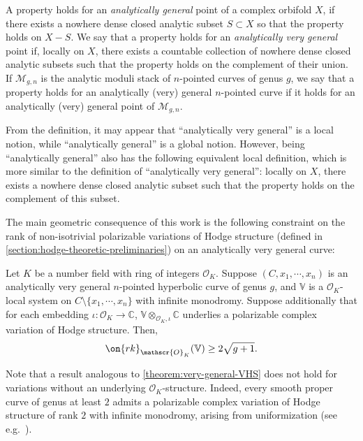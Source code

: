 \begin{definition}
\notready
	\label{definition:general}
	A property holds for an {\em analytically general} point of a complex orbifold $X$,
	if there exists a nowhere dense
	closed analytic subset $S \subset X$ so that the property holds
	on $X - S$.
	We say that a property holds for an
	{\em analytically very general} point if, locally on $X$, there exists a countable collection of nowhere dense closed analytic subsets such that the property holds on the complement of their union. If $\mathscr{M}_{g,n}$ is the analytic moduli stack of
$n$-pointed curves of genus $g$, we say that a property holds for an
analytically (very) general $n$-pointed curve if it holds for an analytically
(very) general point of $\mathscr{M}_{g,n}$.
\end{definition}
\begin{remark}
\notready\label{remark:}
	From the definition, it may appear that ``analytically very general'' is
	a local notion, while ``analytically general'' is a global notion.
	However, being ``analytically general'' also has the following
	equivalent local definition, which is more similar to the definition of
	``analytically very general'':
	locally on $X$, there exists a nowhere dense closed analytic subset such
	that the property holds on the complement of this subset.
\end{remark}

The main geometric consequence of this work is the following constraint on the
rank of non-isotrivial polarizable variations of Hodge structure (defined in
\autoref{section:hodge-theoretic-preliminaries}) on an analytically very general curve:
\begin{theorem}
\notready\label{theorem:very-general-VHS}
	Let $K$ be a number field with ring of integers
$\mathscr{O}_K$. Suppose
$(C, x_1, \cdots, x_n)$
is an analytically very general $n$-pointed
hyperbolic curve of genus $g$, and $\mathbb{V}$ is a $\mathscr{O}_K$-local system on $C\setminus\{x_1, \cdots, x_n\}$ with infinite monodromy.
Suppose additionally that for each embedding $\iota: \mathscr{O}_K\to \mathbb{C}$, $\mathbb{V}\otimes_{\mathscr{O}_K, \iota}\mathbb{C}$ underlies a polarizable complex variation of Hodge structure.
Then, $$\on{rk}_{\mathscr{O}_K}(\mathbb{V})\geq 2\sqrt{g+1}.$$
\end{theorem}
\begin{remark}
\notready
	\label{remark:}
	Note that a result analogous to \autoref{theorem:very-general-VHS} does
	not hold for variations without an underlying $\mathscr{O}_K$-structure.
	Indeed, every smooth proper curve of genus at least $2$ admits a polarizable complex  variation of Hodge structure of rank $2$ with infinite monodromy, arising from uniformization (see e.g.~\cite[bottom of p.~870]{simpson:constructing-VHS}).
\end{remark}


